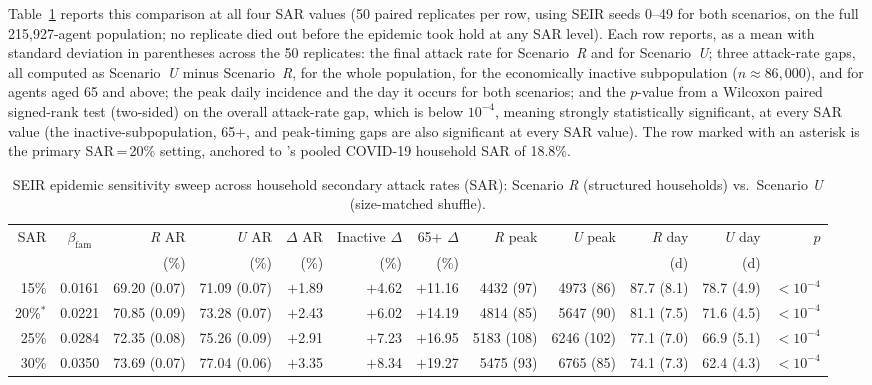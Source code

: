 \documentclass{article}
\begin{document}
Table~\ref{tab:abm_sweep} reports this comparison at all four SAR values (50 paired replicates per row, using SEIR seeds 0--49 for both scenarios, on the full 215,927-agent population; no replicate died out before the epidemic took hold at any SAR level). Each row reports, as a mean with standard deviation in parentheses across the 50 replicates: the final attack rate for Scenario~\textit{R} and for Scenario~\textit{U}; three attack-rate gaps, all computed as Scenario~\textit{U} minus Scenario~\textit{R}, for the whole population, for the economically inactive subpopulation ($n \approx 86{,}000$), and for agents aged 65 and above; the peak daily incidence and the day it occurs for both scenarios; and the $p$-value from a Wilcoxon paired signed-rank test (two-sided) on the overall attack-rate gap, which is below $10^{-4}$, meaning strongly statistically significant, at every SAR value (the inactive-subpopulation, 65+, and peak-timing gaps are also significant at every SAR value). The row marked with an asterisk is the primary SAR\,=\,20\% setting, anchored to \citet{madewell2020household}'s pooled COVID-19 household SAR of 18.8\%.

\begin{landscape}
\begin{table}[htbp]
\centering
\small
\caption{SEIR epidemic sensitivity sweep across household secondary attack rates (SAR): Scenario \textit{R} (structured households) vs.\ Scenario \textit{U} (size-matched shuffle).}
\label{tab:abm_sweep}
\begin{tabular}{rcrrrrrrrrrr}
\toprule
SAR & $\beta_\text{fam}$ & \textit{R} AR & \textit{U} AR & $\Delta$ AR & Inactive $\Delta$ & 65+ $\Delta$ &
\textit{R} peak & \textit{U} peak & \textit{R} day & \textit{U} day & $p$ \\
    &                    & (\%) & (\%) & (\%)        & (\%) & (\%) &
      &        & (d)   & (d)   &     \\
\midrule
15\%     & 0.0161 & 69.20 (0.07) & 71.09 (0.07) & $+$1.89 & $+$4.62 & $+$11.16 & 4432 (97) & 4973 (86) & 87.7 (8.1) & 78.7 (4.9) & $<10^{-4}$ \\
20\%$^*$ & 0.0221 & 70.85 (0.09) & 73.28 (0.07) & $+$2.43 & $+$6.02 & $+$14.19 & 4814 (85) & 5647 (90) & 81.1 (7.5) & 71.6 (4.5) & $<10^{-4}$ \\
25\%     & 0.0284 & 72.35 (0.08) & 75.26 (0.09) & $+$2.91 & $+$7.23 & $+$16.95 & 5183 (108) & 6246 (102) & 77.1 (7.0) & 66.9 (5.1) & $<10^{-4}$ \\
30\%     & 0.0350 & 73.69 (0.07) & 77.04 (0.06) & $+$3.35 & $+$8.34 & $+$19.27 & 5475 (93) & 6765 (85) & 74.1 (7.3) & 62.4 (4.3) & $<10^{-4}$ \\
\bottomrule
\end{tabular}
\end{table}
\end{landscape}
\end{document}
